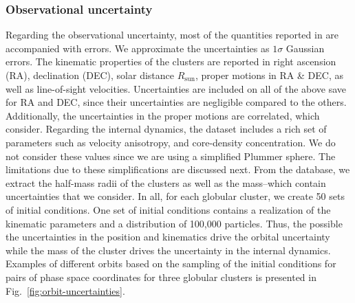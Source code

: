 \subsubsection*{Observational uncertainty}
Regarding the observational uncertainty, most of the quantities reported in \citet{2021yCat..74781520B} are accompanied with errors. We approximate the uncertainties as $1\sigma$ Gaussian errors. The kinematic properties of the clusters are reported in right ascension (RA), declination (DEC), solar distance $R_{\mathrm{sun}}$, proper motions in RA \& DEC, as well as line-of-sight velocities. Uncertainties are included on all of the above save for  RA and DEC, since their uncertainties are negligible compared to the others. Additionally, the uncertainties in the proper motions are correlated, which consider. Regarding the internal dynamics, the dataset includes a rich set of parameters  such as velocity anisotropy, and core-density concentration. We do not consider these values since we are using a simplified Plummer sphere. The limitations due to these simplifications are discussed next. From the database, we extract the half-mass radii of the clusters as well as the mass--which contain uncertainties that we consider. In all, for each globular cluster, we create 50 sets of initial conditions. One set of initial conditions contains a realization of the kinematic parameters and a distribution of 100,000 particles. Thus, the possible the uncertainties in the position and kinematics drive the orbital uncertainty while the mass of the cluster drives the uncertainty in the internal dynamics. Examples of different orbits based on the sampling of the initial conditions for pairs of phase space coordinates for three globular clusters is presented in  Fig.~\ref{fig:orbit-uncertainties}.

